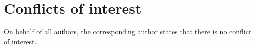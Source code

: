 \documentclass[sn-mathphys,Numbered]{sn-jnl}%
\theoremstyle{thmstyleone}%
\theoremstyle{thmstyletwo}%
\theoremstyle{thmstylethree}%
\begin{document}









\section*{Conflicts of interest}
On behalf of all authors, the corresponding author states that there is no conflict of interest. 

	

\newpage
\appendix



 
\end{document}
